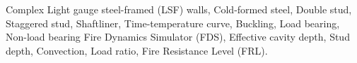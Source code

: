 {

Complex Light gauge steel-framed (LSF) walls, Cold-formed steel, Double stud, Staggered stud, Shaftliner, Time-temperature curve, Buckling, Load bearing, Non-load bearing Fire Dynamics Simulator (FDS), Effective cavity depth, Stud depth, Convection, Load ratio, Fire Resistance Level (FRL).  

}